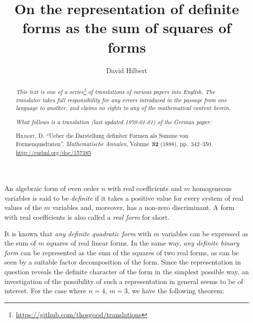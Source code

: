\documentclass{article}
\theoremstyle{plain}
\theoremstyle{definition}
\newcommand{\oldpage}[1]{\marginpar{\footnotesize$\Big\vert$ \textit{p.~#1}}}
\begin{document}
\renewcommand{\abstractname}{Translator's note.}

\title{On the representation of definite forms as the sum of squares of forms}
\author{David Hilbert}
\date{}
\maketitle

\begin{abstract}
  \renewcommand*{\thefootnote}{\fnsymbol{footnote}}
  \emph{This text is one of a series\footnote{\url{https://github.com/thosgood/translations}} of translations of various papers into English.}
  \emph{The translator takes full responsibility for any errors introduced in the passage from one language to another, and claims no rights to any of the mathematical content herein.}
  
  \emph{What follows is a translation (last updated \today) of the German paper:}

  \medskip\noindent
  \textsc{Hilbert, D.}
  ``Ueber die Darstellung definiter Formen als Summe von Formenquadraten''.
  \emph{Mathematische Annalen}, Volume~\textbf{32} (1888), pp.~342--350.
  {\footnotesize\url{http://eudml.org/doc/157385}}
\end{abstract}

\setcounter{footnote}{0}
\renewcommand{\thefootnote}{\fnsymbol{footnote}}



\bigskip

\oldpage{342}

An algebraic form of even order $n$ with real coefficients and $m$ homogeneous variables is said to be \emph{definite} if it takes a positive value for every system of real values of the $m$ variables and, moreover, has a non-zero discriminant.
A form with real coefficients is also called a \emph{real form} for short.

It is known that \emph{any definite quadratic form} with $m$ variables can be expressed as the sum of $m$ squares of real linear forms.
In the same way, \emph{any definite binary form} can be represented as the sum of the squares of two real forms, as can be seen by a suitable factor decomposition of the form.
Since the representation in question reveals the definite character of the form in the simplest possible way, an investigation of the possibility of such a representation in general seems to be of interest.
For the case where $n=4$, $m=3$, we have the following theorem:
\end{document}
